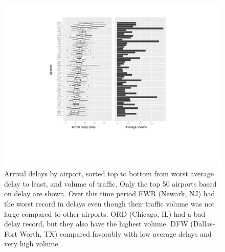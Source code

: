 \documentclass{article}
\begin{document}
\begin{figure}[htp]
\centerline{\includegraphics[width=5in]{images/airlines2.pdf}}
\caption{Arrival delays by airport, sorted top to bottom from worst average delay to least, and volume of traffic. Only the top 50 airports based on delay are shown. Over this time period EWR (Newark, NJ) had the worst record in delays even though their traffic volume was not large compared to other airports. ORD (Chicago, IL) had a bad delay record, but they also have the highest volume. DFW (Dallas-Fort Worth, TX) compared favorably with low average delays and very high volume.}
\label{airlines2}
\end{figure}
\end{document}
